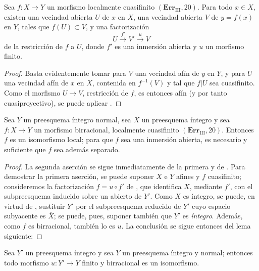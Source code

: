 
\begin{corollary}[8.12.9]
\label{IV.8.12.9-fr}

Sea $f:X\to Y$ un morfismo localmente cuasifinito $(\mathbf{Err}_{\mathrm{III}}, 20)$.
Para todo $x\in X$, existen una vecindad abierta $U$ de $x$ en $X$, una vecindad abierta $V$ de $y=f(x)$ en $Y$, tales que $f(U)\subset V$, y una factorización
\[
U\xrightarrow{f'}V'\xrightarrow{u}V
\]
de la restricción de $f$ a $U$, donde $f'$ es una inmersión abierta y $u$ un morfismo finito.
\end{corollary}

\begin{proof}
Basta evidentemente tomar para $V$ una vecindad afín de $y$ en $Y$, y para $U$ una vecindad afín de $x$ en $X$, contenida en $f^{-1}(V)$ y tal que $f|U$ sea cuasifinito.
Como el morfismo $U\to V$, restricción de $f$, es entonces afín (y por tanto cuasiproyectivo), se puede aplicar .
\end{proof}

\begin{corollary}[8.12.10]
Sea $Y$ un preesquema íntegro normal, sea $X$ un preesquema íntegro y sea $f:X\to Y$ un morfismo birracional, localmente cuasifinito $(\mathbf{Err}_{\mathrm{III}}, 20)$.
Entonces $f$ es un isomorfismo local; para que $f$ sea una inmersión abierta, es necesario y suficiente que $f$ sea además separado.
\end{corollary}

\begin{proof}
La segunda aserción se sigue inmediatamente de la primera y de .
Para demostrar la primera aserción, se puede suponer $X$ e $Y$ afines y $f$ cuasifinito; consideremos la factorización $f=u\circ f'$ de , que identifica $X$, mediante $f'$, con el subpreesquema inducido sobre un abierto de $Y'$.
Como $X$ es íntegro, se puede, en virtud de , sustituir $Y'$ por el subpreesquema reducido de $Y'$ cuyo espacio subyacente es $\overline X$; se puede, pues, suponer también que $Y'$ es \emph{íntegro}.
Además, como $f$ es birracional, también lo es $u$.
La conclusión se sigue entonces del lema siguiente:
\end{proof}

\begin{lemma}[8.12.10.1]
\label{IV.8.12.10.1-fr}
Sea $Y'$ un preesquema íntegro y sea $Y$ un preesquema íntegro y normal; entonces todo morfismo $u:Y'\to Y$ finito y birracional es un isomorfismo.
\end{lemma}

